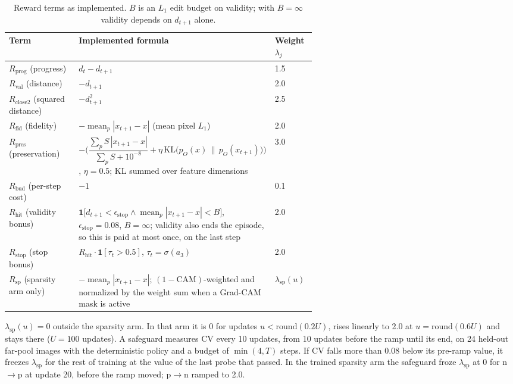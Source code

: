 \begin{table}[t]
\centering
\caption{Reward terms as implemented. $B$ is an $L_1$ edit budget on validity; with $B = \infty$ validity depends on $d_{t+1}$ alone.}
\label{tab:repro-reward}
\small
\begin{tabular}{@{}l p{0.60\linewidth} l@{}}
\toprule
Term & Implemented formula & Weight $\lambda_j$ \\
\midrule
$R_{\text{prog}}$ (progress) & $d_t - d_{t+1}$ & 1.5 \\
$R_{\text{val}}$ (distance) & $-d_{t+1}$ & 2.0 \\
$R_{\text{close2}}$ (squared distance) & $-d_{t+1}^2$ & 2.5 \\
$R_{\text{fid}}$ (fidelity) & $-\operatorname{mean}_p |x_{t+1} - x|$ (mean pixel $L_1$) & 2.0 \\
$R_{\text{pres}}$ (preservation) & $-\Big(\dfrac{\sum_p S\,|x_{t+1} - x|}{\sum_p S + 10^{-8}} + \eta\,\mathrm{KL}\big(p_O(x)\,\|\,p_O(x_{t+1})\big)\Big)$, $\eta = 0.5$; KL summed over feature dimensions & 3.0 \\
$R_{\text{bud}}$ (per-step cost) & $-1$ & 0.1 \\
$R_{\text{hit}}$ (validity bonus) & $\mathbf{1}\big[d_{t+1} < \epsilon_{\text{stop}} \wedge \operatorname{mean}_p|x_{t+1} - x| < B\big]$, $\epsilon_{\text{stop}} = 0.08$, $B = \infty$; validity also ends the episode, so this is paid at most once, on the last step & 2.0 \\
$R_{\text{stop}}$ (stop bonus) & $R_{\text{hit}} \cdot \mathbf{1}[\tau_t > 0.5]$, $\tau_t = \sigma(a_3)$ & 2.0 \\
$R_{\text{sp}}$ (sparsity arm only) & $-\operatorname{mean}_p |x_{t+1} - x|$; $(1 - \text{CAM})$-weighted and normalized by the weight sum when a Grad-CAM mask is active & $\lambda_{\text{sp}}(u)$ \\
\bottomrule
\end{tabular}
\end{table}

$\lambda_{\text{sp}}(u) = 0$ outside the sparsity arm. In that arm it is 0 for updates $u < \mathrm{round}(0.2U)$, rises linearly to 2.0 at $u = \mathrm{round}(0.6U)$ and stays there ($U = 100$ updates). A safeguard measures CV every 10 updates, from 10 updates before the ramp until its end, on 24 held-out far-pool images with the deterministic policy and a budget of $\min(4, T)$ steps. If CV falls more than 0.08 below its pre-ramp value, it freezes $\lambda_{\text{sp}}$ for the rest of training at the value of the last probe that passed. In the trained sparsity arm the safeguard froze $\lambda_{\text{sp}}$ at 0 for n$\to$p at update 20, before the ramp moved; p$\to$n ramped to 2.0.

